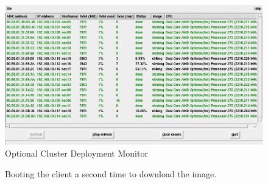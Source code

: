 
\begin{figure}[htbp]
  \begin{center}
    \includegraphics[scale=\imgscale]{figs/si_monitortk}
    \caption{Optional Cluster Deployment Monitor}
    \label{fig:sbs-si-monitortk}
  \end{center}
\end{figure}


\begin{figure}[!ht]
  \begin{center}
    \centerline{
      }
    \caption{Booting the client a second time to download the image.}
    \label{fig:sbs-install-boot}
  \end{center}
\end{figure}

